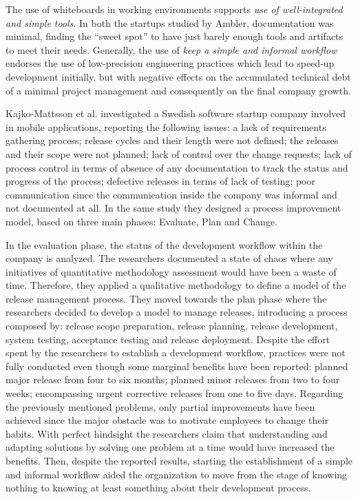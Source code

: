 \documentclass[10pt,journal,letterpaper,compsoc]{IEEEtran}
\begin{document}
The use of whiteboards in working environments supports \textit{use of 
well-integrated and simple tools}. In both the startups studied by Ambler, 
documentation was minimal, finding the ``sweet spot'' to have just barely enough 
tools and artifacts to meet their needs. Generally, the use of \textit{keep a 
simple and informal workflow} endorses the use of low-precision engineering 
practices which lead to speed-up development initially, but with negative 
effects on the accumulated technical debt of a minimal project management and 
consequently on the final company growth. 

Kajko-Mattsson et al. \cite{Kajko-Mattsson2008} investigated a Swedish software 
startup company involved in mobile applications, reporting the following issues: 
a lack of requirements gathering process; release cycles and their length were 
not defined; the releases and their scope were not planned; lack of control over 
the change requests; lack of process control in terms of  absence of any 
documentation to track the status and progress of the process; defective 
releases in terms of lack of testing; poor communication since the communication 
inside the company was informal and not documented at all. In the same study 
they designed a process improvement model, based on three main phases: Evaluate, 
Plan and Change. 

In the evaluation phase, the status of the development workflow within the 
company  is analyzed. The researchers documented a state of chaos where any 
initiatives of quantitative methodology assessment would have been a waste of 
time. Therefore, they applied a qualitative methodology to define a model of the 
release management process. They moved towards the plan phase where the 
researchers decided to develop a model to manage releases, introducing a process 
composed by: release scope preparation, release planning, release development, 
system testing, acceptance testing and release deployment. Despite the effort 
spent by the researchers to establish a development workflow, practices were not 
fully conducted even though some marginal benefits have been reported: planned 
major release from four to six months; planned minor releases from two to four 
weeks; encompassing urgent corrective releases from one to five days. Regarding 
the previously mentioned problems, only 
partial improvements have been achieved since the major obstacle was to 
motivate employees to change their habits. With perfect hindsight the 
researchers claim that understanding and adapting solutions by solving one 
problem at a time would have increased the benefits. Then, despite the reported 
results, starting the establishment of a simple and informal workflow aided the 
organization to move from the stage of knowing nothing to knowing at least 
something about their development process. 
\end{document}
